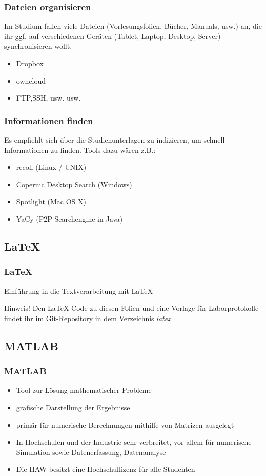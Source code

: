 \documentclass[german,ignorenonframetext]{beamer} %
\begin{document}
\begin{frame}
\frametitle{Dateien organisieren}
Im Studium fallen viele Dateien (Vorlesungsfolien, Bücher, Manuals, usw.) an, die ihr ggf. auf verschiedenen Geräten (Tablet, Laptop, Desktop, Server) synchronisieren wollt.
\begin{itemize}
\pause
\item Dropbox
\pause	
\item owncloud
\pause
\item FTP,SSH, usw. usw.
\end{itemize}
\end{frame}

\begin{frame}
\frametitle{Informationen finden}
Es empfiehlt sich über die Studienunterlagen zu indizieren, um schnell Informationen zu finden. Tools dazu wären z.B.:
\begin{itemize}
\item recoll (Linux / UNIX)
\pause
\item Copernic Desktop Search (Windows)
\pause
\item Spotlight (Mac OS X)
\pause
\item YaCy (P2P Searchengine in Java)
\end{itemize}
\end{frame}


\subsection{LaTeX}
\begin{frame}
\frametitle{LaTeX}

Einführung in die Textverarbeitung mit LaTeX\\

\pause
\begin{block}{Hinweis!}
Den LaTeX Code zu diesen Folien und eine Vorlage für Laborprotokolle findet ihr im Git-Repository in dem Verzeichnis \textit{latex}
\end{block}
\end{frame}


\subsection{MATLAB}
\begin{frame}
\frametitle{MATLAB}
\begin{itemize}
\item Tool zur Lösung mathematischer Probleme
\pause
\item grafische Darstellung der Ergebnisse
\pause
\item primär für numerische Berechnungen mithilfe von Matrizen ausgelegt
\pause
\item In Hochschulen und der Industrie sehr verbreitet, vor allem für numerische Simulation sowie Datenerfassung, Datenanalyse
\pause
\item Die HAW besitzt eine Hochschullizenz für alle Studenten
\end{itemize}
\end{frame} 
\end{document}
